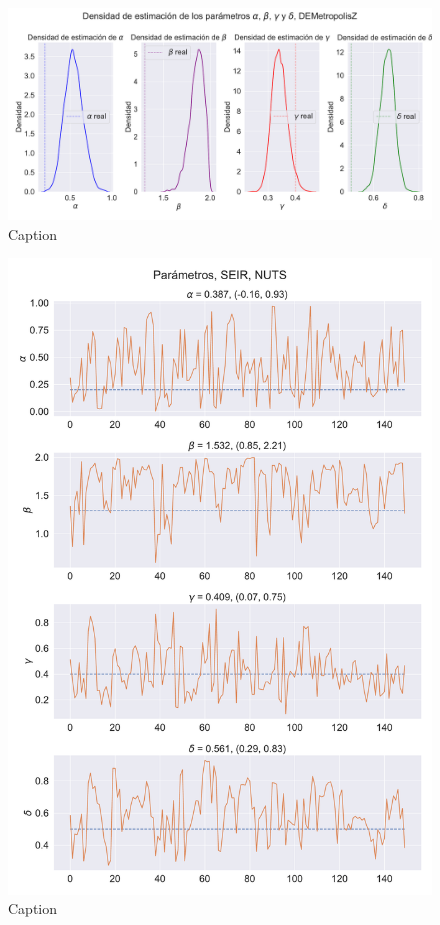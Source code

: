\begin{figure}[h]
    \centering
    \includegraphics[width=0.8\linewidth]{img/content/chapter4/DEMetropolis_seir_params_density_mean.pdf}
    \caption{Caption}
    \label{fig:enter-label}
\end{figure}

\begin{figure}[h]
    \centering
    \includegraphics[width=0.8\linewidth]{img/content/chapter4/NUTS_seir_params_trace.pdf}
    \caption{Caption}
    \label{fig:enter-label}
\end{figure}


